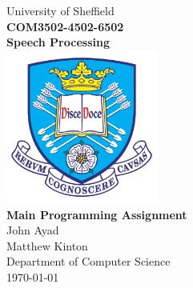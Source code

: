 \documentclass[hidelinks,a4paper,11pt]{article}
\begin{document}
\begin{titlepage}

\begin{center}
{\LARGE University of Sheffield}\\[1cm]
\huge {\bfseries COM3502-4502-6502\\Speech Processing}\\[1cm]
\includegraphics[width=5cm]{tuoslogo.png}\\[1cm]
{\huge \bfseries Main Programming Assignment}\\[0.5cm]

{\Large John Ayad}\\
{\Large Matthew Kinton}\\[1cm]

{\LARGE Department of Computer Science}\\
{\Large \today}
\end{center}

\end{titlepage}
\end{document}
